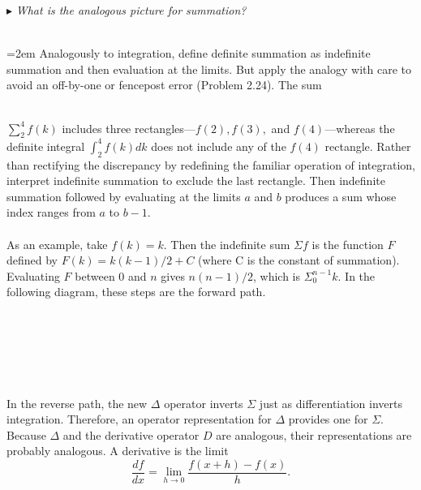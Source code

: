 \documentclass[fleqn]{book}
\begin{document}
\noindent \large $\blacktriangleright$ \textit{What is the analogous picture for summation?}
\\
\\
\noindent
\begin{minipage}[h]{70mm}\parindent=2em
\Large Analogously to integration, define definite summation as indefinite summation and then evaluation at the limits. But apply the analogy with care to avoid an off-by-one or
fencepost error (Problem 2.24). The sum  
\end{minipage} \\ 
$\sum\nolimits_2^4 f(k)$ \Large includes three rectangles—$f(2), f(3),$ and $f(4)$—whereas the definite integral $\int_{2}^{4}f(k)dk$ does not include any of the $f(4)$ rectangle. Rather than rectifying the discrepancy by redefining the familiar operation of integration, interpret indefinite summation to exclude the last rectangle.
Then indefinite summation followed by evaluating at the limits $a$ and $b$ produces a sum whose index ranges from $a$ to $b − 1$.
\\
\\
\Large As an example, take $f(k) = k$. Then the indefinite sum $\Sigma f$ is the function $F$ defined by $F(k) = k(k−1)/2+C$ (where C is the constant of summation). Evaluating $F$ between 0 and $n$ gives $n(n − 1)/2$, which is $\Sigma_0^{n-1}k$. In the following diagram, these steps are the forward path.
\\
\\
\\
\\
\\
\\
\\
In the reverse path, the new $\Delta$ operator inverts $\Sigma$ just as differentiation
inverts integration. Therefore, an operator representation for $\Delta$ provides
one for $\Sigma$. Because $\Delta$ and the derivative operator $D$ are analogous, their
representations are probably analogous. A derivative is the limit\\

\begin{equation}
\frac{df}{dx}=\lim_{h\rightarrow 0}\frac{f(x+h)-f(x)}{h}.
\end{equation}

\newpage
\pagestyle{fancy}


\renewcommand{\headrulewidth}{0pt}
\fancyhf{}

\end{document}
